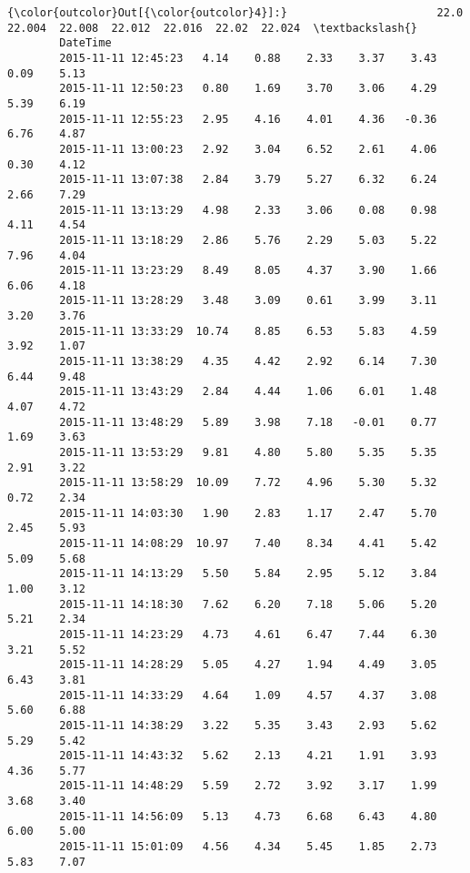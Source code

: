 \documentclass[a4paper,dvipdfmx]{jsarticle}
\begin{document}
            \begin{Verbatim}[commandchars=\\\{\}]
{\color{outcolor}Out[{\color{outcolor}4}]:}                       22.0  22.004  22.008  22.012  22.016  22.02  22.024  \textbackslash{}
        DateTime                                                                    
        2015-11-11 12:45:23   4.14    0.88    2.33    3.37    3.43   0.09    5.13   
        2015-11-11 12:50:23   0.80    1.69    3.70    3.06    4.29   5.39    6.19   
        2015-11-11 12:55:23   2.95    4.16    4.01    4.36   -0.36   6.76    4.87   
        2015-11-11 13:00:23   2.92    3.04    6.52    2.61    4.06   0.30    4.12   
        2015-11-11 13:07:38   2.84    3.79    5.27    6.32    6.24   2.66    7.29   
        2015-11-11 13:13:29   4.98    2.33    3.06    0.08    0.98   4.11    4.54   
        2015-11-11 13:18:29   2.86    5.76    2.29    5.03    5.22   7.96    4.04   
        2015-11-11 13:23:29   8.49    8.05    4.37    3.90    1.66   6.06    4.18   
        2015-11-11 13:28:29   3.48    3.09    0.61    3.99    3.11   3.20    3.76   
        2015-11-11 13:33:29  10.74    8.85    6.53    5.83    4.59   3.92    1.07   
        2015-11-11 13:38:29   4.35    4.42    2.92    6.14    7.30   6.44    9.48   
        2015-11-11 13:43:29   2.84    4.44    1.06    6.01    1.48   4.07    4.72   
        2015-11-11 13:48:29   5.89    3.98    7.18   -0.01    0.77   1.69    3.63   
        2015-11-11 13:53:29   9.81    4.80    5.80    5.35    5.35   2.91    3.22   
        2015-11-11 13:58:29  10.09    7.72    4.96    5.30    5.32   0.72    2.34   
        2015-11-11 14:03:30   1.90    2.83    1.17    2.47    5.70   2.45    5.93   
        2015-11-11 14:08:29  10.97    7.40    8.34    4.41    5.42   5.09    5.68   
        2015-11-11 14:13:29   5.50    5.84    2.95    5.12    3.84   1.00    3.12   
        2015-11-11 14:18:30   7.62    6.20    7.18    5.06    5.20   5.21    2.34   
        2015-11-11 14:23:29   4.73    4.61    6.47    7.44    6.30   3.21    5.52   
        2015-11-11 14:28:29   5.05    4.27    1.94    4.49    3.05   6.43    3.81   
        2015-11-11 14:33:29   4.64    1.09    4.57    4.37    3.08   5.60    6.88   
        2015-11-11 14:38:29   3.22    5.35    3.43    2.93    5.62   5.29    5.42   
        2015-11-11 14:43:32   5.62    2.13    4.21    1.91    3.93   4.36    5.77   
        2015-11-11 14:48:29   5.59    2.72    3.92    3.17    1.99   3.68    3.40   
        2015-11-11 14:56:09   5.13    4.73    6.68    6.43    4.80   6.00    5.00   
        2015-11-11 15:01:09   4.56    4.34    5.45    1.85    2.73   5.83    7.07   

\end{Verbatim}
\end{document}
